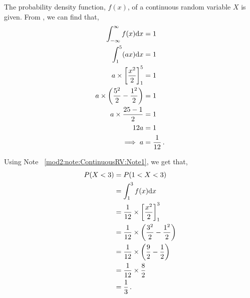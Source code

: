 %
%


\begin{subquestions}
	
\subquestion


The probability density function, $f(x)$, of a continuous random variable $X$ is given.
From , we can find that,
\begin{align}
	\int_{-\infty}^{\infty} f(x)\mathrm{d}x  & = 1 \nonumber \\
	\int_{1}^{5} (ax)\mathrm{d}x  & = 1 \nonumber \\
	a \times \left[\frac{x^2}{2}\right]^5_1 & = 1 \nonumber \\
	a \times \left(\frac{5^2}{2}- \frac{1^2}{2}\right) & = 1 \nonumber \\
	a \times \frac{25-1}{2} & = 1 \nonumber \\
	12a & = 1 \nonumber \\
	\implies a & = \frac{1}{12} \,.
\end{align}
	

\subquestion

Using Note ~\ref{mod2:note:ContinuousRV:Note1}, we get that,
\begin{align}
	P(X<3) & = P(1<X<3) \nonumber \\
	       & = \int_{1}^{3} f(x)\mathrm{d}x \nonumber \\
	       & = \frac{1}{12} \times \left[\frac{x^2}{2}\right]^3_1 \nonumber \\
	       & = \frac{1}{12} \times \left(\frac{3^2}{2} - \frac{1^2}{2}\right) \nonumber \\
	       & = \frac{1}{12} \times \left(\frac{9}{2} - \frac{1}{2}\right) \nonumber \\
	       & = \frac{1}{12} \times \frac{8}{2} \nonumber \\
	       & = \frac{1}{3} \,. 
\end{align}
	

\end{subquestions}

